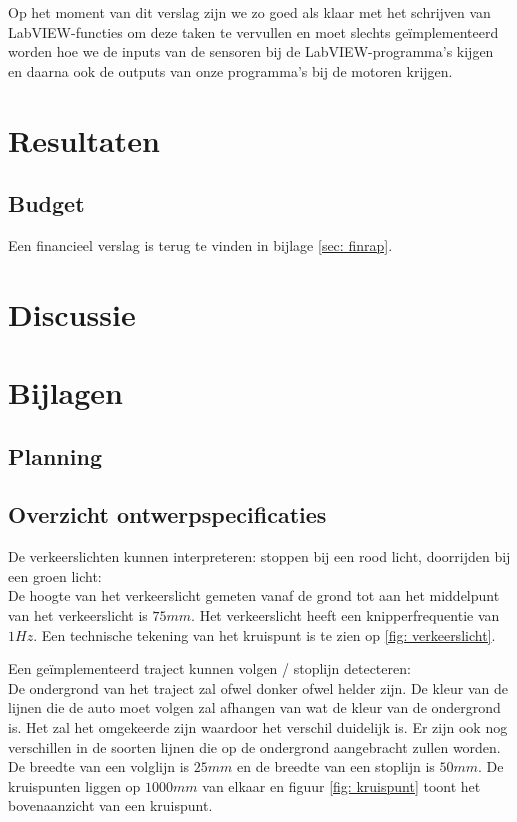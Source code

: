 \documentclass[a4paper,twoside,kulak]{kulakreport}
\begin{document}
	Op het moment van dit verslag zijn we zo goed als klaar met het schrijven van LabVIEW-functies om deze taken te vervullen en moet slechts geïmplementeerd worden hoe we de inputs van de sensoren bij de LabVIEW-programma's kijgen en daarna ook de outputs van onze programma’s bij de motoren krijgen.
	
	
	\chapter{Resultaten}
	
	\section{Budget}
	Een financieel verslag is terug te vinden in bijlage \ref{sec: finrap}.
	
	\chapter{Discussie}
	\chapter{Bijlagen}
	\section{Planning}
	\label{sec: planning}
	
	
	
	

	
	
	
	\section{Overzicht ontwerpspecificaties}
	\label{sec: ontws}
	De verkeerslichten kunnen interpreteren: stoppen bij een rood licht, doorrijden bij een groen licht:\\
	De hoogte van het verkeerslicht gemeten vanaf de grond tot aan het middelpunt van het verkeerslicht is $75mm$. Het verkeerslicht heeft een knipperfrequentie van $1Hz$. Een technische tekening van het kruispunt is te zien op \ref{fig: verkeerslicht}.
	\bigskip
	
	
	
	Een geïmplementeerd traject kunnen volgen / stoplijn detecteren:\\
	De ondergrond van het traject zal ofwel donker ofwel helder zijn. De kleur van de lijnen die de auto moet volgen zal afhangen van wat de kleur van de ondergrond is. Het zal het omgekeerde zijn waardoor het verschil duidelijk is. Er zijn ook nog verschillen in de soorten lijnen die op de ondergrond aangebracht zullen worden. De breedte van een volglijn is $25mm$ en de breedte van een stoplijn is $50mm$. De kruispunten liggen op $1000mm$ van elkaar en figuur \ref{fig: kruispunt} toont het bovenaanzicht van een kruispunt. 
	
\end{document}
